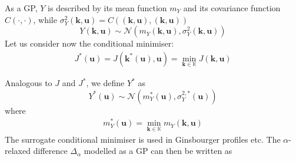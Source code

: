\documentclass[a4paper,11pt]{article}
\newcommand{\Kspace}{\mathbb{K}}
\theoremstyle{defi}
\numberwithin{thmCounter}{section}
\begin{document}
As a GP, $Y$ is described by its mean function $m_{Y}$ and its covariance function $C(\cdot, \cdot)$, while $\sigma^2_Y(\mathbf{k},\mathbf{u}) = C((\mathbf{k},\mathbf{u}), (\mathbf{k},\mathbf{u}))$
\begin{equation}
  Y(\mathbf{k},\mathbf{u}) \sim \mathcal{N}\left(m_{Y}(\mathbf{k},\mathbf{u}), \sigma^2_Y(\mathbf{k},\mathbf{u}) \right)
\end{equation}
Let us consider now the conditional minimiser:
\begin{align}
  J^*(\mathbf{u}) = J(\mathbf{k}^*(\mathbf{u}),\mathbf{u}) = \min_{\mathbf{k}\in\Kspace} J(\mathbf{k},\mathbf{u})
\end{align}

Analogous to $J$ and $J^*$, we define $Y^*$ as
\begin{equation}
  Y^*(\mathbf{u}) \sim \mathcal{N}\left(m^*_Y(\mathbf{u}), \sigma^{2,*}_Y(\mathbf{u})\right)
\end{equation}
where
\begin{align}
  m^*_Y(\mathbf{u}) = \min_{\mathbf{k}\in\Kspace} m_Y(\mathbf{k},\mathbf{u})
\end{align}
The surrogate conditional minimiser is used in Ginsbourger profiles etc.
The $\alpha$-relaxed difference  $\Delta_{\alpha}$ modelled as a GP can then be written as
\end{document}
